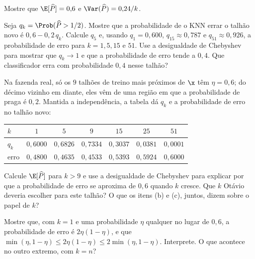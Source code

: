 \begin{itens}
  \item {} Mostre que $\E[\widehat P]=0{,}6$ e $\Var(\widehat P)=0{,}24/k$.
  \item {} Seja $q_k=\Prob(\widehat P>1/2)$. Mostre que a probabilidade de o KNN errar
        o talhão novo é $0{,}6-0{,}2\,q_k$. Calcule $q_5$ e, usando $q_1=0{,}600$,
        $q_{15}\approx0{,}787$ e $q_{51}\approx0{,}926$, a probabilidade de erro para
        $k=1,5,15$ e $51$. Use a desigualdade de Chebyshev para mostrar que $q_k\to1$ e que a
        probabilidade de erro tende a $0{,}4$. Que classificador erra com probabilidade
        $0{,}4$ nesse talhão?
  \item {} Na fazenda real, só os $9$ talhões de treino mais próximos de $\x$ têm
        $\eta=0{,}6$; do décimo vizinho em diante, eles vêm de uma região em que a
        probabilidade de praga é $0{,}2$. Mantida a independência, a tabela dá $q_k$ e a
        probabilidade de erro no talhão novo:
        \begin{center}\small
        \renewcommand{\arraystretch}{1.2}
        \begin{tabular}{@{}lcccccc@{}}
        \toprule
        $k$ & $1$ & $5$ & $9$ & $15$ & $25$ & $51$ \\
        \midrule
        $q_k$ & $0{,}6000$ & $0{,}6826$ & $0{,}7334$ & $0{,}3037$ & $0{,}0381$ & $0{,}0001$ \\
        erro & $0{,}4800$ & $0{,}4635$ & $0{,}4533$ & $0{,}5393$ & $0{,}5924$ & $0{,}6000$ \\
        \bottomrule
        \end{tabular}
        \end{center}
        Calcule $\E[\widehat P]$ para $k>9$ e use a desigualdade de Chebyshev para explicar
        por que a probabilidade de erro se aproxima de $0{,}6$ quando $k$ cresce. Que $k$
        Otávio deveria escolher para este talhão? O que os itens (b) e (c), juntos, dizem
        sobre o papel de $k$?
  \item {} Mostre que, com $k=1$ e uma probabilidade $\eta$ qualquer no lugar de
        $0{,}6$, a probabilidade de erro é $2\eta(1-\eta)$, e que
        $\min(\eta,1-\eta)\le2\eta(1-\eta)\le2\min(\eta,1-\eta)$. Interprete. O que acontece
        no outro extremo, com $k=n$?
\end{itens}

